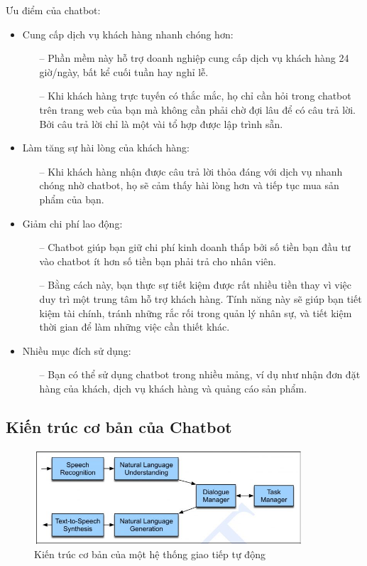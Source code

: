 Ưu điểm của chatbot:
\begin{itemize}
    \item Cung cấp dịch vụ khách hàng nhanh chóng hơn:
          \begin{itemize}
              \item[--] Phần mềm này hỗ trợ doanh nghiệp cung cấp dịch vụ khách hàng 24 giờ/ngày, bất kể cuối tuần hay nghỉ lễ.
              \item[--] Khi khách hàng trực tuyến có thắc mắc, họ chỉ cần hỏi trong chatbot trên trang web của bạn mà không cần phải chờ đợi lâu để có câu trả lời. Bởi câu trả lời chỉ là một vài tổ hợp được lập trình sẵn.
          \end{itemize}
    \item Làm tăng sự hài lòng của khách hàng:
          \begin{itemize}
              \item[--] Khi khách hàng nhận được câu trả lời thỏa đáng với dịch vụ nhanh chóng nhờ chatbot, họ sẽ cảm thấy hài lòng hơn và tiếp tục mua sản phẩm của bạn.
          \end{itemize}
    \item Giảm chi phí lao động:
          \begin{itemize}
              \item[--] Chatbot giúp bạn giữ chi phí kinh doanh thấp bởi số tiền bạn đầu tư vào chatbot ít hơn số tiền bạn phải trả cho nhân viên.
              \item[--] Bằng cách này, bạn thực sự tiết kiệm được rất nhiều tiền thay vì việc duy trì một trung tâm hỗ trợ khách hàng. Tính năng này sẽ giúp bạn tiết kiệm tài chính, tránh những rắc rối trong quản lý nhân sự, và tiết kiệm thời gian để làm những việc cần thiết khác.
          \end{itemize}
    \item Nhiều mục đích sử dụng:
          \begin{itemize}
              \item[--] Bạn có thể sử dụng chatbot trong nhiều mảng, ví dụ như nhận đơn đặt hàng của khách, dịch vụ khách hàng và quảng cáo sản phẩm.
          \end{itemize}
\end{itemize}
\subsection{Kiến trúc cơ bản của Chatbot}
\begin{figure}[htp]
    \centering
    \includegraphics[width=10cm]{images/k.jpg}
    \caption{Kiến trúc cơ bản của một hệ thống giao tiếp tự động}
    \label{fig:system-class-intent}
\end{figure}

